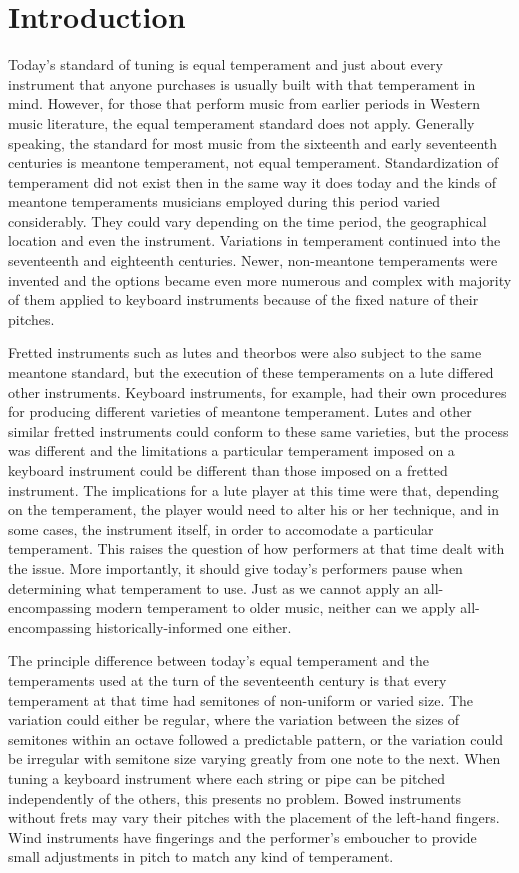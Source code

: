 \chapter*{Introduction}

Today's standard of tuning is equal temperament and just about every instrument that
anyone purchases is usually built with that temperament in mind.  However, for those that
perform music from earlier periods in Western music literature, the equal temperament
standard does not apply.  Generally speaking, the standard for most music from the
sixteenth and early seventeenth centuries is meantone temperament, not equal temperament.
Standardization of temperament did not exist then in the same way it does
today and the kinds of meantone temperaments musicians employed during this period varied
considerably.  They could vary depending on the time period, the geographical location and
even the instrument.  Variations in temperament continued into the seventeenth and
eighteenth centuries.  Newer, non-meantone temperaments were invented and the options
became even more numerous and complex with majority of them applied to keyboard
instruments because of the fixed nature of their pitches.

Fretted instruments such as lutes and theorbos were also subject to the same meantone
standard, but the execution of these temperaments on a lute differed other instruments.
Keyboard instruments, for example, had their own procedures for producing different
varieties of meantone temperament.  Lutes and other similar fretted instruments could
conform to these same varieties, but the process was different and the limitations a
particular temperament imposed on a keyboard instrument could be different than those
imposed on a fretted instrument.  The implications for a lute player at this time were
that, depending on the temperament, the player would need to alter his or her technique,
and in some cases, the instrument itself, in order to accomodate a particular temperament.
This raises the question of how performers at that time dealt with the issue.  More
importantly, it should give today's performers pause when determining what temperament to
use.  Just as we cannot apply an all-encompassing modern temperament to older music,
neither can we apply all-encompassing historically-informed one either.

The principle difference between today's equal temperament and the temperaments used
at the turn of the seventeenth century is that every temperament at that time had semitones
of non-uniform or varied size.  The variation could either be regular, where the variation
between the sizes of semitones within an octave followed a predictable pattern, or the
variation could be irregular with semitone size varying greatly from one note to the next.
When tuning a keyboard instrument where each string or pipe can be pitched independently
of the others, this presents no problem.  Bowed instruments without frets may vary their
pitches with the placement of the left-hand fingers.  Wind instruments have fingerings and
the performer's emboucher to provide small adjustments in pitch to match any kind of
temperament.

